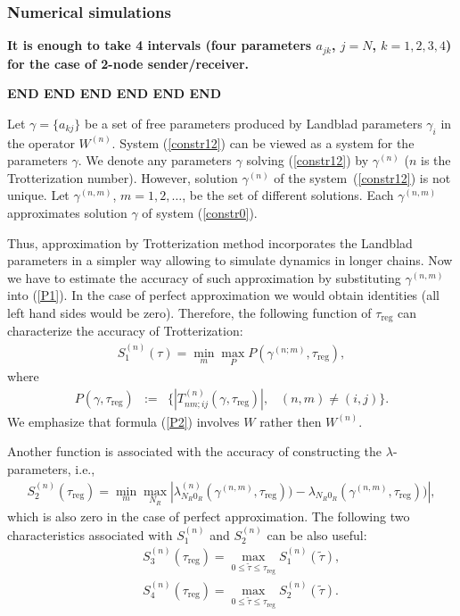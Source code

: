 \documentclass[pra,preprint,showpacs]{revtex4-1}
\begin{document}
{\subsubsection{Numerical simulations}

{\bf It is enough to take 4 intervals (four parameters $a_{jk}$, $j=N$, $k=1,2,3,4$) for the case of 2-node sender/receiver.}

\iffalse
{\bf END   END  END  END  END  END}

Let $\gamma= \{a_{kj}\}$ be a set of free parameters produced by Landblad parameters $\gamma_i$  in the operator $W^{(n)}$. System (\ref{constr12}) can be viewed as a system for the parameters $\gamma$. We denote any parameters $\gamma$  solving  (\ref{constr12}) by $\gamma^{(n)}$ ($n$ is the Trotterization number).
However,  solution $\gamma^{(n)}$ of the system~(\ref{constr12}) is not unique.
Let $\gamma^{(n,m)}$, $m=1,2,\dots$,  be the set of different solutions.
Each  $\gamma^{(n,m)}$ approximates solution $\gamma$ of system
(\ref{constr0}).

Thus, approximation by Trotterization method incorporates the Landblad parameters in a simpler way allowing to simulate dynamics in longer chains. Now we have to estimate the accuracy of such approximation by substituting $\gamma^{(n,m)}$ into (\ref{P1}). In the case of perfect approximation we would obtain identities (all left hand sides would be zero). Therefore, the following function { of $\tau_{\mathrm{reg}}$} can characterize the accuracy of Trotterization:
\begin{eqnarray}\label{epsilon}
S^{(n)}_1(\tau) =\min_m \max_P P(\gamma^{(n;m)},\tau_{\mathrm{reg}}),
\end{eqnarray}
where
\begin{eqnarray}\label{P2}
 P(\gamma,\tau_{\mathrm{reg}})&:=&\Big\{|T^{(n)}_{nm;ij}(\gamma,\tau_{\mathrm{reg}})|, \;\;\;(n,m)\neq (i,j)\Big\}.
\end{eqnarray}
We emphasize that formula (\ref{P2}) involves $W$ rather then $W^{(n)}$.

Another function is associated with the accuracy of constructing the $\lambda$-parameters, i.e.,
\begin{eqnarray}\label{epsilon2}
S^{(n)}_2(\tau_{\mathrm{reg}}) =\min_m\max_{N_R} \left|\lambda^{(n)}_{N_R0_R}(\gamma^{(n,m)},\tau_{\mathrm{reg}})) -
\lambda_{N_R0_R}(\gamma^{(n,m)},\tau_{\mathrm{reg}}))\right|,
\end{eqnarray}
which is also zero in the case of perfect approximation.
The following two characteristics associated with $S_1^{(n)}$ and $S_2^{(n)}$ can be also useful:
\begin{eqnarray}\label{S3}
&&
S^{(n)}_3(\tau_{\mathrm{reg}}) = \max_{0\le\tilde \tau\le \tau_{\mathrm{reg}}} S^{(n)}_1(\tilde \tau),
\\\label{S4}
&&
S^{(n)}_4(\tau_{\mathrm{reg}}) = \max_{0\le\tilde \tau\le \tau_{\mathrm{reg}}} S^{(n)}_2(\tilde \tau).
\end{eqnarray}

}
\end{document}
